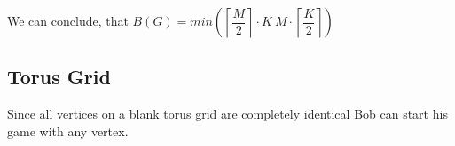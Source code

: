 \documentclass[12pt,a4paper, flushleft]{article}
\newcommand{\ceil}[1]{\left\lceil #1 \right\rceil}
\begin{document}
	We can conclude, that $B(G) = min\left( \ceil{\dfrac{M}{2}}\cdot K~M\cdot \ceil{\dfrac{K}{2}}\right)$
	
\subsection{Torus Grid}

Since all vertices on a blank torus grid are completely identical Bob can start his game with any vertex.  
\end{document}

